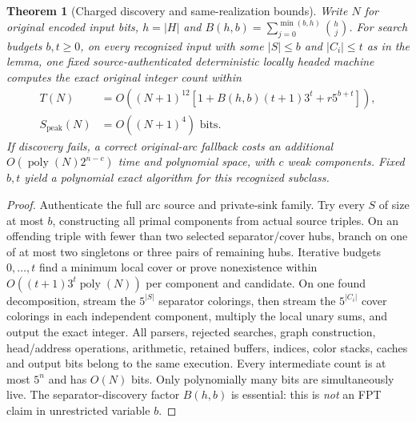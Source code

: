 \documentclass[11pt]{article}
\newtheorem{theorem}{Theorem}
\begin{document}
\begin{theorem}[Charged discovery and same-realization bounds]
Write $N$ for original encoded input bits, $h=|H|$ and
$B(h,b)=\sum_{j=0}^{\min(b,h)}\binom hj$.
For search budgets $b,t\ge0$, on every recognized input with
some $|S|\le b$ and $|C_i|\le t$ as in the lemma, one fixed
source-authenticated deterministic locally headed machine
computes the exact original integer count within
\[
\boxed{\begin{aligned}
T(N)&=O\!\left((N+1)^{12}
 [1+B(h,b)(t+1)3^t+r5^{b+t}]\right),\\
S_{\mathrm{peak}}(N)&=O((N+1)^4)\text{ bits}.
\end{aligned}}
\]
If discovery fails, a correct original-arc fallback costs
an additional $O(\operatorname{poly}(N)2^{n-c})$ time and
polynomial space, with $c$ weak components. Fixed $b,t$
yield a polynomial exact algorithm for this recognized subclass.
\end{theorem}
\begin{proof}
Authenticate the full arc source and private-sink family.
Try every $S$ of size at most $b$, constructing all primal
components from actual source triples. On an offending triple
with fewer than two selected separator/cover hubs, branch on
one of at most two singletons or three pairs of remaining hubs.
Iterative budgets $0,\ldots,t$ find a minimum local cover or
prove nonexistence within $O((t+1)3^t\operatorname{poly}(N))$
per component and candidate. On one found decomposition,
stream the $5^{|S|}$ separator colorings, then stream the
$5^{|C_i|}$ cover colorings in each independent component,
multiply the local unary sums, and output the exact integer.
All parsers, rejected searches, graph construction, head/address
operations, arithmetic, retained buffers, indices, color stacks,
caches and output bits belong to the same execution.
Every intermediate count is at most $5^n$ and has $O(N)$ bits.
Only polynomially many bits are simultaneously live.
The separator-discovery factor $B(h,b)$ is essential:
this is \emph{not} an FPT claim in unrestricted variable $b$.
\end{proof}
\end{document}
